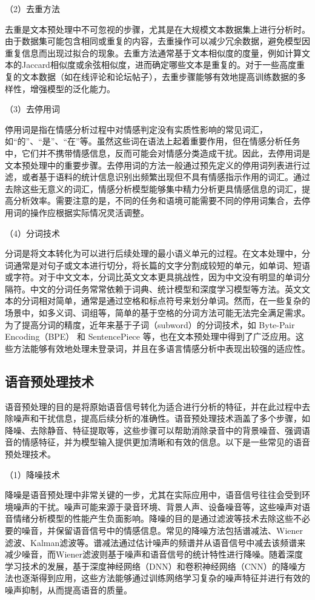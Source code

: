 （2）去重方法

去重是文本预处理中不可忽视的步骤，尤其是在大规模文本数据集上进行分析时。由于数据集可能包含相同或重复的内容，去重操作可以减少冗余数据，避免模型因重复信息而出现过拟合的现象。去重方法通常基于文本相似度的度量，例如计算文本的Jaccard相似度或余弦相似度，进而确定哪些文本是重复的。对于一些高度重复的文本数据（如在线评论和论坛帖子），去重步骤能够有效地提高训练数据的多样性，增强模型的泛化能力。

（3）去停用词

停用词是指在情感分析过程中对情感判定没有实质性影响的常见词汇，如“的”、“是”、“在”等。虽然这些词在语法上起着重要作用，但在情感分析任务中，它们并不携带情感信息，反而可能会对情感分类造成干扰。因此，去停用词是文本预处理中的重要步骤。去停用词的方法一般通过预先定义的停用词列表进行过滤，或者基于语料的统计信息识别出频繁出现但不具有情感指示作用的词汇。通过去除这些无意义的词汇，情感分析模型能够集中精力分析更具情感信息的词汇，提高分析效率。需要注意的是，不同的任务和语境可能需要不同的停用词集合，去停用词的操作应根据实际情况灵活调整。

（4）分词技术

分词是将文本转化为可以进行后续处理的最小语义单元的过程。在文本处理中，分词通常是对句子或文本进行切分，将长篇的文字分割成较短的单元，如单词、短语或字符。对于中文文本，分词比英文文本更具挑战性，因为中文没有明显的单词分隔符。中文的分词任务常常依赖于词典、统计模型和深度学习模型等方法。英文文本的分词相对简单，通常是通过空格和标点符号来划分单词。然而，在一些复杂的场景中，如多义词、词组等，简单的基于空格的分词方法可能无法完全满足需求。为了提高分词的精度，近年来基于子词（subword）的分词技术，如 Byte-Pair Encoding（BPE） 和 SentencePiece 等，也在文本预处理中得到了广泛应用。这些方法能够有效地处理未登录词，并且在多语言情感分析中表现出较强的适应性。

\subsection{语音预处理技术}

语音预处理的目的是将原始语音信号转化为适合进行分析的特征，并在此过程中去除噪声和干扰信息，提高后续分析的准确性。语音预处理技术涵盖了多个步骤，如降噪、去除静音、特征提取等，这些步骤可以帮助消除录音中的背景噪音、强调语音的情感特征，并为模型输入提供更加清晰和有效的信息。以下是一些常见的语音预处理技术。

（1）降噪技术

降噪是语音预处理中非常关键的一步，尤其在实际应用中，语音信号往往会受到环境噪声的干扰。噪声可能来源于录音环境、背景人声、设备噪音等，这些噪声对语音情绪分析模型的性能产生负面影响。降噪的目的是通过滤波等技术去除这些不必要的噪音，并保留语音信号中的情感信息。常见的降噪方法包括谱减法、Wiener滤波、Kalman滤波等。谱减法通过估计噪声的频谱并从语音信号中减去该频谱来减少噪音，而Wiener滤波则基于噪声和语音信号的统计特性进行降噪。随着深度学习技术的发展，基于深度神经网络（DNN）和卷积神经网络（CNN）的降噪方法也逐渐得到应用，这些方法能够通过训练网络学习复杂的噪声特征并进行有效的噪声抑制，从而提高语音的质量。

